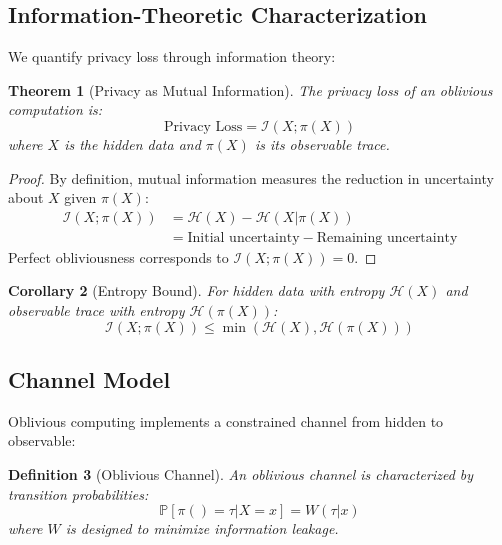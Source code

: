 \documentclass[11pt,final,hidelinks]{article}
\newtheorem{theorem}{Theorem}[section]
\newtheorem{corollary}[theorem]{Corollary}
\newtheorem{definition}[theorem]{Definition}
\newcommand{\Pattern}[1]{\pi(#1)}
\newcommand{\Entropy}[1]{\mathcal{H}(#1)}
\newcommand{\MutualInfo}[2]{\mathcal{I}(#1; #2)}
\newcommand{\Prob}[1]{\mathbb{P}\left[#1\right]}
\begin{document}
\subsection{Information-Theoretic Characterization}

We quantify privacy loss through information theory:

\begin{theorem}[Privacy as Mutual Information]
The privacy loss of an oblivious computation is:
\begin{equation}
\text{Privacy Loss} = \MutualInfo{X}{\Pattern{X}}
\end{equation}
where $X$ is the hidden data and $\Pattern{X}$ is its observable trace.
\end{theorem}

\begin{proof}
By definition, mutual information measures the reduction in uncertainty about $X$ given $\Pattern{X}$:
\begin{align}
\MutualInfo{X}{\Pattern{X}} &= \Entropy{X} - \Entropy{X|\Pattern{X}} \\
&= \text{Initial uncertainty} - \text{Remaining uncertainty}
\end{align}
Perfect obliviousness corresponds to $\MutualInfo{X}{\Pattern{X}} = 0$.
\end{proof}

\begin{corollary}[Entropy Bound]
For hidden data with entropy $\Entropy{X}$ and observable trace with entropy $\Entropy{\Pattern{X}}$:
\begin{equation}
\MutualInfo{X}{\Pattern{X}} \leq \min(\Entropy{X}, \Entropy{\Pattern{X}})
\end{equation}
\end{corollary}

\subsection{Channel Model}

Oblivious computing implements a constrained channel from hidden to observable:

\begin{definition}[Oblivious Channel]
An oblivious channel is characterized by transition probabilities:
\begin{equation}
\Prob{\Pattern{} = \tau | X = x} = W(\tau|x)
\end{equation}
where $W$ is designed to minimize information leakage.
\end{definition}
\end{document}
